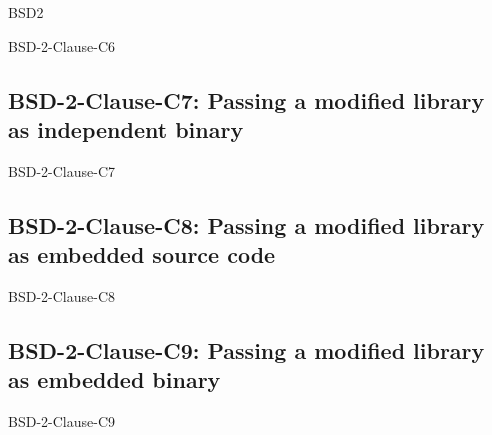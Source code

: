 \begin{license}{BSD2}
\begin{lsuc}{BSD-2-Clause-C6}
  \lsucmeans{\useCaseSix}
  \lsuccovers{\coversSix}

  \begin{lsucrequires}
    \lsucmandatory{\keepLicenseElements}
  \end{lsucrequires}

  \lsucprohibitsnothing
\end{lsuc}

\subsection{BSD-2-Clause-C7: Passing a modified library as independent binary}
\begin{lsuc}{BSD-2-Clause-C7}

  \lsucmeans{\useCaseSeven}
  \lsuccovers{\coversSeven}

  \begin{lsucrequires}
    \lsucmandatory{\insertLicenseIntoBinary}\passingFilesCorrectly
  \end{lsucrequires}

  \lsucprohibitsnothing
\end{lsuc}

\subsection{BSD-2-Clause-C8: Passing a modified library as embedded source code}
\begin{lsuc}{BSD-2-Clause-C8}

  \lsucmeans{\useCaseEight}
  \lsuccovers{\coversEight}

  \begin{lsucrequires}
    \lsucmandatory{\keepLicenseElements}
    \lsucoptional{\addLibraryLicenseToCopyrightMessage}
    \lsucoptional{\keepSourcesSeparate}
  \end{lsucrequires}

  \lsucprohibitsnothing
\end{lsuc}

\subsection{BSD-2-Clause-C9: Passing a modified library as embedded binary}
\begin{lsuc}{BSD-2-Clause-C9}


\end{lsuc}
\end{license}
